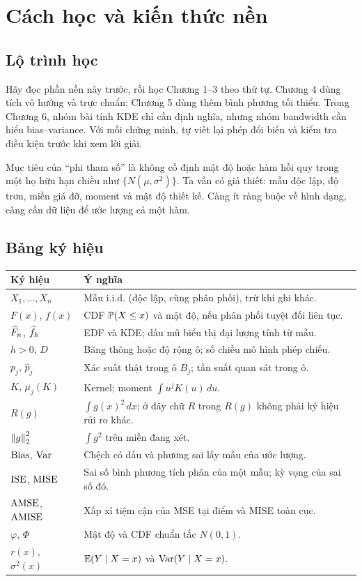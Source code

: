 \chapter*{Cách học và kiến thức nền}
\section*{Lộ trình học}
Hãy đọc phần nền này trước, rồi học Chương 1--3 theo thứ tự. Chương 4 dùng
tích vô hướng và trực chuẩn; Chương 5 dùng thêm bình phương tối thiểu.
Trong Chương 6, nhóm bài tính KDE chỉ cần định nghĩa, nhưng nhóm bandwidth
cần hiểu bias--variance. Với mỗi chứng minh, tự viết lại phép đổi biến và
kiểm tra điều kiện trước khi xem lời giải.

Mục tiêu của ``phi tham số'' là không cố định mật độ hoặc hàm hồi quy trong
một họ hữu hạn chiều như $\{N(\mu,\sigma^2)\}$. Ta vẫn có giả thiết:
mẫu độc lập, độ trơn, miền giá đỡ, moment và mật độ thiết kế. Càng ít
ràng buộc về hình dạng, càng cần dữ liệu để ước lượng cả một hàm.

\section*{Bảng ký hiệu}
\begin{longtable}{p{}p{}}
\toprule Ký hiệu & Ý nghĩa\\\midrule\endhead
$X_1,\ldots,X_n$ & Mẫu i.i.d. (độc lập, cùng phân phối), trừ khi ghi khác.\\
$F(x)$, $f(x)$ & CDF $\mathbb P(X\leq x)$ và mật độ, nếu phân phối tuyệt đối liên tục.\\
$\widehat F_n$, $\widehat f_h$ & EDF và KDE; dấu mũ biểu thị đại lượng tính từ mẫu.\\
$h>0$, $D$ & Băng thông hoặc độ rộng ô; số chiều mô hình phép chiếu.\\
$p_j$, $\widehat p_j$ & Xác suất thật trong ô $B_j$; tần suất quan sát trong ô.\\
$K$, $\mu_j(K)$ & Kernel; moment $\int u^jK(u)\,du$.\\
$R(g)$ & $\int g(x)^2\,dx$; ở đây chữ $R$ trong $R(g)$ không phải ký hiệu rủi ro khác.\\
$\left\lVert g\right\rVert_2^2$ & $\int g^2$ trên miền đang xét.\\
$\operatorname{Bias}$, $\operatorname{Var}$ & Chệch có dấu và phương sai lấy mẫu của ước lượng.\\
$\operatorname{ISE}$, $\operatorname{MISE}$ & Sai số bình phương tích phân của một mẫu; kỳ vọng của sai số đó.\\
$\operatorname{AMSE}$, $\operatorname{AMISE}$ & Xấp xỉ tiệm cận của MSE tại điểm và MISE toàn cục.\\
$\varphi$, $\Phi$ & Mật độ và CDF chuẩn tắc $N(0,1)$.\\
$r(x)$, $\sigma^2(x)$ & $\mathbb E(Y\mid X=x)$ và $\operatorname{Var}(Y\mid X=x)$.\\
\bottomrule
\end{longtable}

